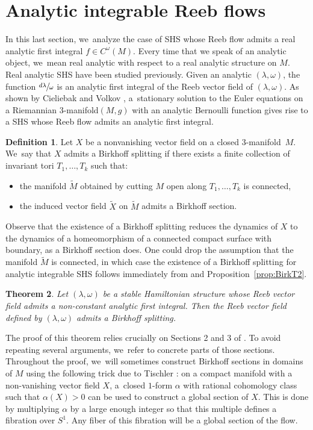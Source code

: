 \documentclass[11pt]{article}
\newcommand{\threemanifold}{$3$\nobreakdash-mani\-fold\xspace}
\newtheorem{theorem}{Theorem}[section]
\theoremstyle{definition}
\newtheorem{defi}[theorem]{Definition}
\begin{document}
\section{Analytic integrable Reeb flows}\label{sec:analytic}

In this last section, we~analyze the case of SHS whose Reeb flow admits a real analytic first integral $f\in C^\omega (M)$. Every time that we speak of an analytic object, we~mean real analytic with respect to a real analytic structure on $M$. Real analytic SHS have been studied previously. Given an analytic $(\lambda,\omega)$, the function $\sfrac{d\lambda}{\omega}$ is an analytic first integral of the Reeb vector field of $(\lambda,\omega)$. As shown by
Cieliebak and Volkov \cite{CV2}, a~stationary solution to the Euler equations on a Riemannian \threemanifold $(M,g)$ with an analytic Bernoulli function gives rise to a SHS whose Reeb flow admits an analytic first integral.

\begin{defi}\label{def:Bsplit}
Let $X$ be a nonvanishing vector field on a closed \threemanifold~$M$. We~say that $X$ admits a Birkhoff splitting if there exists a finite collection of invariant tori $T_1,\dots,T_k$ such that:
\begin{itemize}
\item
the manifold $\widetilde M$ obtained by cutting $M$ open along $T_1,\dots,T_k$ is connected,
\item
the induced vector field $\widetilde X$ on $\widetilde M$ admits a Birkhoff section.
\end{itemize}
\end{defi}
Observe that the existence of a Birkhoff splitting reduces the dynamics of $X$ to the dynamics of a homeomorphism of a connected compact surface with boundary, as a Birkhoff section does. One could drop the assumption that the manifold $\widetilde M$ is connected, in which case the existence of a Birkhoff splitting for analytic integrable SHS follows immediately from \cite{CV2} and Proposition~\ref{prop:BirkT2}.

\begin{theorem}\label{thm:split}
Let $(\lambda,\omega)$ be a stable Hamiltonian structure whose Reeb vector field admits a non-constant analytic first integral. Then the Reeb vector field defined by $(\lambda,\omega)$ admits a Birkhoff splitting.
\end{theorem}

The proof of this theorem relies crucially on Sections 2 and 3 of \cite{CV2}. To avoid repeating several arguments, we~refer to concrete parts of those sections. Throughout the proof, we~will sometimes construct Birkhoff sections in domains of $M$ using the following trick due to Tischler \cite{Tis}: on a compact manifold with a non-vanishing vector field $X$, a~closed $1$-form $\alpha$ with rational cohomology class such that $\alpha(X)>0$ can be used to construct a global section of $X$. This is done by multiplying $\alpha$ by a large enough integer so that this multiple defines a fibration over $S^1$. Any fiber of this fibration will be a global section of the flow.
\end{document}
